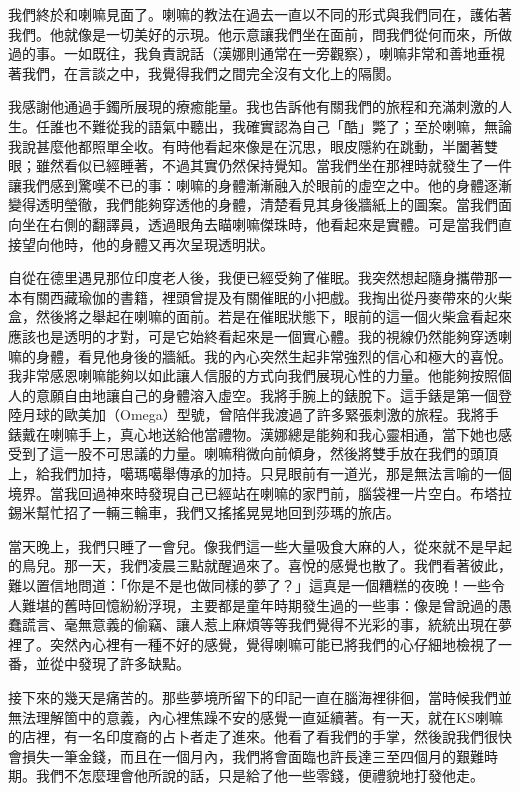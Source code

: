 我們終於和喇嘛見面了。喇嘛的教法在過去一直以不同的形式與我們同在，護佑著我們。他就像是一切美好的示現。他示意讓我們坐在面前，問我們從何而來，所做過的事。一如既往，我負責說話（漢娜則通常在一旁觀察），喇嘛非常和善地垂視著我們，在言談之中，我覺得我們之間完全沒有文化上的隔閡。

我感謝他通過手鐲所展現的療癒能量。我也告訴他有關我們的旅程和充滿刺激的人生。任誰也不難從我的語氣中聽出，我確實認為自己「酷」斃了；至於喇嘛，無論我說甚麼他都照單全收。有時他看起來像是在沉思，眼皮隱約在跳動，半闔著雙眼；雖然看似已經睡著，不過其實仍然保持覺知。當我們坐在那裡時就發生了一件讓我們感到驚嘆不已的事：喇嘛的身體漸漸融入於眼前的虛空之中。他的身體逐漸變得透明瑩徹，我們能夠穿透他的身體，清楚看見其身後牆紙上的圖案。當我們面向坐在右側的翻譯員，透過眼角去瞄喇嘛傑珠時，他看起來是實體。可是當我們直接望向他時，他的身體又再次呈現透明狀。

自從在德里遇見那位印度老人後，我便已經受夠了催眠。我突然想起隨身攜帶那一本有關西藏瑜伽的書籍，裡頭曾提及有關催眠的小把戲。我掏出從丹麥帶來的火柴盒，然後將之舉起在喇嘛的面前。若是在催眠狀態下，眼前的這一個火柴盒看起來應該也是透明的才對，可是它始終看起來是一個實心體。我的視線仍然能夠穿透喇嘛的身體，看見他身後的牆紙。我的內心突然生起非常強烈的信心和極大的喜悅。我非常感恩喇嘛能夠以如此讓人信服的方式向我們展現心性的力量。他能夠按照個人的意願自由地讓自己的身體溶入虛空。我將手腕上的錶脫下。這手錶是第一個登陸月球的歐美加（Omega）型號，曾陪伴我渡過了許多緊張刺激的旅程。我將手錶戴在喇嘛手上，真心地送給他當禮物。漢娜總是能夠和我心靈相通，當下她也感受到了這一股不可思議的力量。喇嘛稍微向前傾身，然後將雙手放在我們的頭頂上，給我們加持，噶瑪噶舉傳承的加持。只見眼前有一道光，那是無法言喻的一個境界。當我回過神來時發現自己已經站在喇嘛的家門前，腦袋裡一片空白。布塔拉錫米幫忙招了一輛三輪車，我們又搖搖晃晃地回到莎瑪的旅店。

當天晚上，我們只睡了一會兒。像我們這一些大量吸食大麻的人，從來就不是早起的鳥兒。那一天，我們凌晨三點就醒過來了。喜悅的感覺也散了。我們看著彼此，難以置信地問道：「你是不是也做同樣的夢了？」這真是一個糟糕的夜晚！一些令人難堪的舊時回憶紛紛浮現，主要都是童年時期發生過的一些事：像是曾說過的愚蠢謊言、毫無意義的偷竊、讓人惹上麻煩等等我們覺得不光彩的事，統統出現在夢裡了。突然內心裡有一種不好的感覺，覺得喇嘛可能已將我們的心仔細地檢視了一番，並從中發現了許多缺點。

接下來的幾天是痛苦的。那些夢境所留下的印記一直在腦海裡徘徊，當時候我們並無法理解箇中的意義，內心裡焦躁不安的感覺一直延續著。有一天，就在KS喇嘛的店裡，有一名印度裔的占卜者走了進來。他看了看我們的手掌，然後說我們很快會損失一筆金錢，而且在一個月內，我們將會面臨也許長達三至四個月的艱難時期。我們不怎麼理會他所說的話，只是給了他一些零錢，便禮貌地打發他走。

